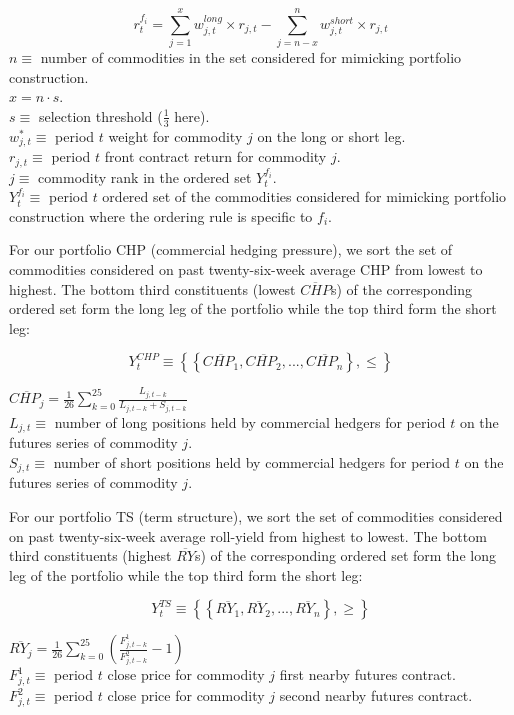 \documentclass[
  authoryear,
  preprint,
  3p]{elsarticle}
\begin{document}
\[r_{t}^{f_{i}}=\sum_{j=1}^{x}w^{long}_{j,t} \times r_{j,t}-\sum_{j=n-x}^{n}w^{short}_{j,t} \times r_{j,t}\]
\(n\equiv\) number of commodities in the set considered for mimicking
portfolio construction.\\
\(x = n \cdot s\).\\
\(s\equiv\) selection threshold (\(\frac{1}{3}\) here).\\
\(w^{*}_{j,t}\equiv\) period \(t\) weight for commodity \(j\) on the
long or short leg.\\
\(r_{j,t}\equiv\) period \(t\) front contract return for commodity
\(j\).\\
\(j\equiv\) commodity rank in the ordered set \(Y_{t}^{f_{i}}\).\\
\(Y_{t}^{f_{i}}\equiv\) period \(t\) ordered set of the commodities
considered for mimicking portfolio construction where the ordering rule
is specific to \(f_{i}\).

\medskip

For our portfolio CHP (commercial hedging pressure), we sort the set of
commodities considered on past twenty-six-week average CHP from lowest
to highest. The bottom third constituents (lowest \(\overline{CHP}\)s)
of the corresponding ordered set form the long leg of the portfolio
while the top third form the short leg:

\[Y_{t}^{CHP}\equiv\left \{ \left \{ \overline{CHP_{1}}, \overline{CHP_{2}}, ..., \overline{CHP_{n}} \right \}, \leq \right \}\]

\(\overline{CHP_{j}}=\frac{1}{26}\sum_{k=0}^{25}\frac{L_{j,t-k}}{L_{j,t-k}+S_{j,t-k}}\)\\
\(L_{j,t}\equiv\) number of long positions held by commercial hedgers
for period \(t\) on the futures series of commodity \(j\).\\
\(S_{j,t}\equiv\) number of short positions held by commercial hedgers
for period \(t\) on the futures series of commodity \(j\).

\medskip

For our portfolio TS (term structure), we sort the set of commodities
considered on past twenty-six-week average roll-yield from highest to
lowest. The bottom third constituents (highest \(\overline{RY}\)s) of
the corresponding ordered set form the long leg of the portfolio while
the top third form the short leg:

\[Y_{t}^{TS}\equiv\left \{ \left \{ \overline{RY_{1}}, \overline{RY_{2}}, ..., \overline{RY_{n}} \right \}, \geq \right \}\]

\(\overline{RY_{j}}=\frac{1}{26}\sum_{k=0}^{25}(\frac{F_{j,t-k}^{1}}{F_{j,t-k}^{2}} - 1)\)\\
\(F_{j,t}^{1}\equiv\) period \(t\) close price for commodity \(j\) first
nearby futures contract.\\
\(F_{j,t}^{2}\equiv\) period \(t\) close price for commodity \(j\)
second nearby futures contract.
\end{document}
